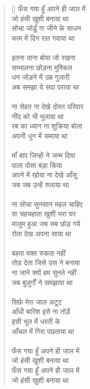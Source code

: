 \begin{verse}[\versewidth]\texthindi{
फँस गया हूँ अपने ही जाल में\\
जो हंसी खुशी बनाया था\\
सोचा जोड़ूँ गा जीने के साधन\\
काम में दिन रात गवाया था\\
\\
इतना ताना बोया जो रखना\\
सम्भालना छोड़ना मुश्किल\\
धन जोड़ने में उम्र गुज़ारी\\
अब समझा ये सदा पराया था\\
\\
ना सेहत ना देखे दोस्त परिवार\\
नींद को भी भुलाया था\\
रब का ध्यान ना शुक्रिया बोला\\
अपनी धुन में समाया था\\
\\
माँ बाप जिन्हों ने जन्म दिया\\
पाला पोसा बड़ा किया\\
अपने में खोया ना देखे आँसू\\
जब जब उन्हें रुलाया था\\
\\
ना सोचा सुनसान महल चाहिए\\
या चहचहाता खुशी भरा घर\\
मालूम हुआ जब सब छोड़ गये\\
रोता देख अपना साया था\\
\\
बहता वक्त रुकता नहीं\\
तोड़ देता जिसे उस ने बनाया\\
ना जाने क्यों हम सुनते नहीं\\
जब बुज़ुर्गों ने समझाया था\\
\\
सिर्फ़ मेरा जाल अटूट\\
आँधी बारिश इसे ना तोड़ें\\
इसी भूल में धरती के\\
आँचल में गिरा पछताया था\\
\\
फँस गया हूँ अपने ही जाल में\\
जो हंसी खुशी बनाया था\\
फँस गया हूँ अपने ही जाल में\\
जो हंसी खुशी बनाया था
}\end{verse}

